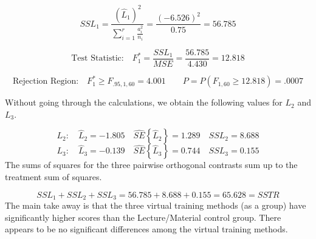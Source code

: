 \documentclass[
]{book}
\begin{document}
\[
SSL_1 = \frac{\left(\hat{L}_1\right)^2}{\sum_{i=1}^r\frac{a_i^2}{n_i}}=
\frac{(-6.526)^2}{0.75}=56.785
\]

\[
\mbox{Test Statistic:} \quad F_1^* = \frac{SSL_1}{MSE}=\frac{56.785}{4.430}=12.818 
\]

\[
\mbox{Rejection Region:}\quad F_1^*\ge F_{.95,1,60}=4.001
\qquad
P=P\left(F_{1,60}\ge 12.818\right)=.0007
\]

Without going through the calculations, we obtain the following values
for \(L_2\) and \(L_3\).

\[
L_2: \quad \hat{L}_2=-1.805 \quad \hat{SE}\left\{\hat{L}_2\right\}=1.289 \quad
SSL_2=8.688
\] \[
L_3: \quad \hat{L}_3=-0.139 \quad \hat{SE}\left\{\hat{L}_3\right\}=0.744 \quad
SSL_3=0.155
\] The sums of squares for the three pairwise orthogonal contrasts sum
up to the treatment sum of squares.

\[
SSL_1+SSL_2+SSL_3=56.785+8.688+0.155=65.628=SSTR
\] The main take away is that the three virtual training methods (as a
group) have significantly higher scores than the Lecture/Material
control group. There appears to be no significant differences among the
virtual training methods.
\end{document}
